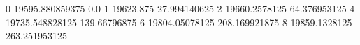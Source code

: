 0 19595.880859375 0.0
1 19623.875 27.994140625
2 19660.2578125 64.376953125
4 19735.548828125 139.66796875
6 19804.05078125 208.169921875
8 19859.1328125 263.251953125
